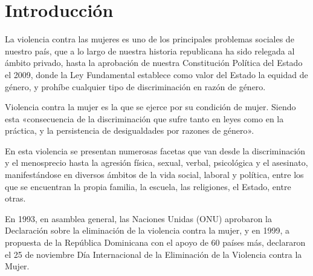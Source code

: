 



\section{Introducción} %

La violencia contra las mujeres es uno de los principales problemas sociales de nuestro país, que a lo largo de nuestra historia republicana ha sido relegada al ámbito privado, hasta la aprobación de nuestra Constitución Política del Estado el 2009, donde la Ley Fundamental
establece como valor del Estado la equidad de género, y prohíbe cualquier tipo de discriminación en razón de género.

Violencia contra la mujer es la que se ejerce por su condición de mujer. Siendo esta «consecuencia de la discriminación que sufre tanto en leyes como en la práctica, y la persistencia de desigualdades por razones de género».

En esta violencia se presentan numerosas facetas que van desde la discriminación y el menosprecio hasta la agresión física, sexual, verbal, psicológica y el asesinato, manifestándose en diversos ámbitos de la vida social, laboral y política, entre los que se encuentran la propia familia, la escuela, las religiones, el Estado, entre otras.

En 1993, en asamblea general, las Naciones Unidas (ONU) aprobaron la Declaración sobre la eliminación de la violencia contra la mujer, y en 1999, a propuesta de la República Dominicana con el apoyo de 60 países más, declararon el 25 de noviembre Día Internacional de la Eliminación de la Violencia contra la Mujer.

